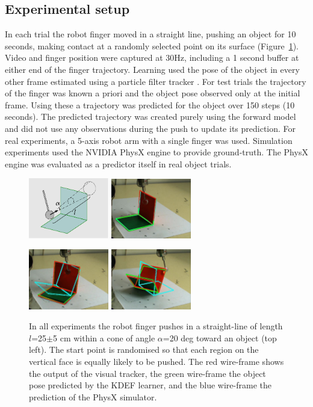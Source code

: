 \subsection{Experimental setup}\label{sec:Experiment.Setup}

In each trial the robot finger moved in a straight line, pushing
an object for 10 seconds, making contact at a randomly selected point
on its surface (Figure~\ref{fig:Setup}). Video and finger position were captured at 30Hz, including a 1 second buffer at either end of the finger trajectory. Learning used the pose of the object in every other frame estimated using a particle filter tracker \citep{morwald_edge_2009}. For test trials the trajectory of the finger was known a priori and the object pose observed only at the initial frame. Using these a trajectory was predicted for the object over 150 steps (10 seconds). The predicted trajectory was created purely using the forward model and did not use any observations during the push to update its prediction. For real experiments, a 5-axis robot arm with a single finger was used. Simulation experiments used the NVIDIA PhysX engine to provide ground-truth. The PhysX engine was evaluated as a predictor itself in real object trials.

\begin{figure}[t]
\centerline{
\includegraphics[width=3.5cm]{training}
\includegraphics[width=3.5cm]{complex1}
}
\centerline{
\includegraphics[width=3.5cm]{complex2}
\includegraphics[width=3.5cm]{complex4}
}
\caption[Setup]{ In all experiments the robot finger pushes in a straight-line of length $l$=25$\pm$5 cm within a cone of angle $\alpha$=20 deg toward an object (top left). The start point is randomised so that each region on the vertical face is equally likely to be pushed. The red wire-frame shows the output of the visual tracker, the green wire-frame the object pose predicted by the KDEF learner, and the blue wire-frame the prediction of the PhysX simulator.}
\label{fig:Setup}
\end{figure}

